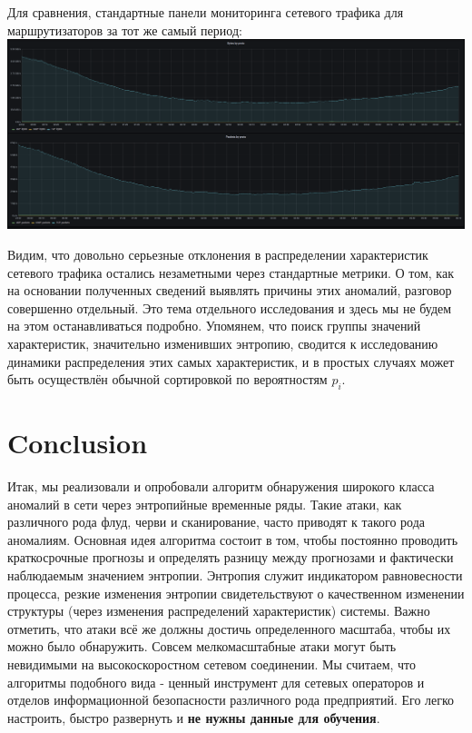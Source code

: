 \documentclass[]{interact}
\theoremstyle{plain}%
\theoremstyle{definition}
\theoremstyle{remark}
\begin{document}
Для сравнения, стандартные панели мониторинга сетевого трафика для маршрутизаторов за тот же самый период:
\includegraphics[scale=0.19]{./img5.png}

Видим, что довольно серьезные отклонения в распределении характеристик сетевого трафика остались незаметными через стандартные метрики. О том, как на основании полученных сведений выявлять причины этих аномалий, разговор совершенно отдельный. Это тема отдельного исследования и здесь мы не будем на этом останавливаться подробно. Упомянем, что поиск группы значений характеристик, значительно изменивших энтропию, сводится к исследованию динамики распределения этих самых характеристик, и в простых случаях может быть осуществлён обычной сортировкой по вероятностям $p_i$.

\section{Conclusion}
Итак, мы реализовали и опробовали алгоритм обнаружения широкого класса аномалий в сети через энтропийные временные ряды. Такие атаки, как различного рода флуд, черви и сканирование, часто приводят к такого рода аномалиям. Основная идея алгоритма состоит в том, чтобы постоянно проводить краткосрочные прогнозы и определять разницу между прогнозами и фактически наблюдаемым значением энтропии. Энтропия служит индикатором равновесности процесса, резкие изменения энтропии свидетельствуют о качественном изменении структуры (через изменения распределений характеристик) системы. Важно отметить, что атаки всё же должны достичь определенного масштаба, чтобы их можно было обнаружить. Совсем мелкомасштабные атаки могут быть невидимыми на высокоскоростном сетевом соединении. Мы считаем, что алгоритмы подобного вида - ценный инструмент для сетевых операторов и отделов информационной безопасности различного рода предприятий. Его легко настроить, быстро развернуть и \textbf{не нужны данные для обучения}.
\end{document}
